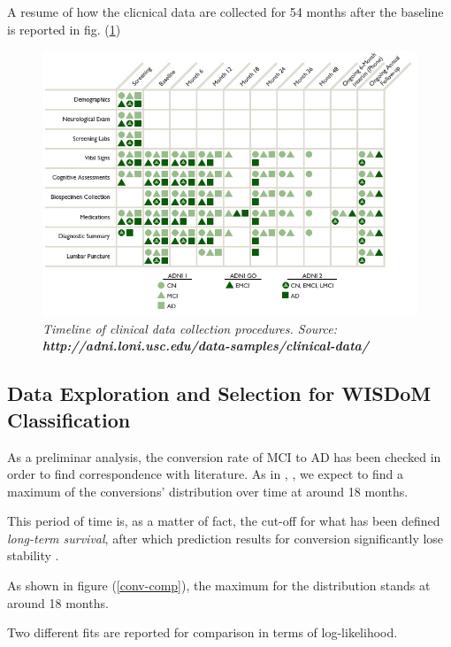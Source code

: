 \documentclass[12pt,openright,twoside,a4paper]{book}
\begin{document}
A resume of how the clicnical data are collected for 54 months after the baseline is reported in fig. (\ref{clinicADNI})

\clearpage

\begin{figure}[!h]
\centering
\includegraphics[scale=0.5]{clinical-ADNI}
\caption{\textit{Timeline of clinical data collection procedures. Source: \textbf{http://adni.loni.usc.edu/data-samples/clinical-data/}}}
\label{clinicADNI}
\end{figure}

\subsection{Data Exploration and Selection for WISDoM Classification}

As a preliminar analysis, the conversion rate of MCI to AD has been checked in order to find correspondence with literature. As in \cite{conv}, \cite{conv2} , we expect to find a maximum of the conversions' distribution over time at around 18 months. 

This period of time is, as a matter of fact, the cut-off for what has been defined \textit{long-term survival}, after which prediction results for conversion significantly lose stability \cite{conv2}.

As shown in figure (\ref{conv-comp}), the maximum for the distribution stands at around 18 months.

Two different fits are reported for comparison in terms of log-likelihood.
\end{document}
